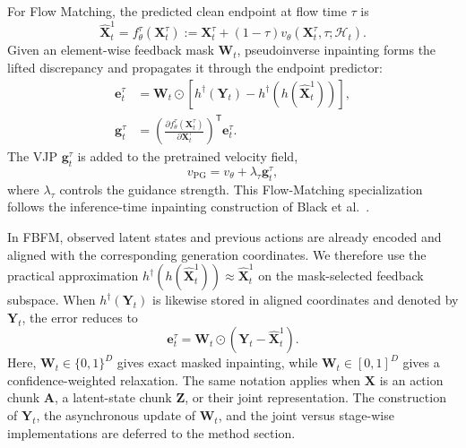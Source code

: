 For Flow Matching, the predicted clean endpoint at flow time $\tau$ is
\begin{equation}
    \hat{\mathbf{X}}_t^1
    =f_\theta^\tau(\mathbf{X}_t^\tau)
    :=\mathbf{X}_t^\tau
    +(1-\tau)v_\theta(\mathbf{X}_t^\tau,\tau;\mathcal{H}_t).
    \label{eq:flow-clean-endpoint}
\end{equation}
Given an element-wise feedback mask $\mathbf{W}_t$, pseudoinverse inpainting
forms the lifted discrepancy and propagates it through the endpoint predictor:
\begin{align}
    \mathbf{e}_t^\tau
    &=
    \mathbf{W}_t\odot
    \left[
        h^\dagger(\mathbf{Y}_t)
        -h^\dagger\!\left(h(\hat{\mathbf{X}}_t^1)\right)
    \right],
    \label{eq:weighted-lifted-error}\\
    \mathbf{g}_t^\tau
    &=
    \left(
        \frac{\partial f_\theta^\tau(\mathbf{X}_t^\tau)}
             {\partial\mathbf{X}_t^\tau}
    \right)^{\mathsf T}
    \mathbf{e}_t^\tau.
    \label{eq:flow-pseudoinverse-vjp}
\end{align}
The VJP $\mathbf{g}_t^\tau$ is added to the pretrained velocity field,
\begin{equation}
    v_{\mathrm{PG}}
    =v_\theta+\lambda_\tau\mathbf{g}_t^\tau,
    \label{eq:pseudoinverse-guided-flow}
\end{equation}
where $\lambda_\tau$ controls the guidance strength. This Flow-Matching
specialization follows the inference-time inpainting construction of
Black et al.~\cite{black2025realtime}.

In FBFM, observed latent states and previous actions are already encoded and aligned
with the corresponding generation coordinates. We therefore use the practical
approximation
$h^\dagger(h(\hat{\mathbf{X}}_t^1))\approx\hat{\mathbf{X}}_t^1$ on the
mask-selected feedback subspace. When $h^\dagger(\mathbf{Y}_t)$ is likewise stored
in aligned coordinates and denoted by $\mathbf{Y}_t$, the error reduces to
\begin{equation}
    \mathbf{e}_t^\tau
    =\mathbf{W}_t\odot
    \left(\mathbf{Y}_t-\hat{\mathbf{X}}_t^1\right).
    \label{eq:fbfm-masked-error-preview}
\end{equation}
Here, $\mathbf{W}_t\in\{0,1\}^D$ gives exact masked inpainting, while
$\mathbf{W}_t\in[0,1]^D$ gives a confidence-weighted relaxation. The same notation
applies when $\mathbf{X}$ is an action chunk $\mathbf{A}$, a latent-state chunk
$\mathbf{Z}$, or their joint representation. The construction of
$\mathbf{Y}_t$, the asynchronous update of $\mathbf{W}_t$, and the joint versus
stage-wise implementations are deferred to the method section.

